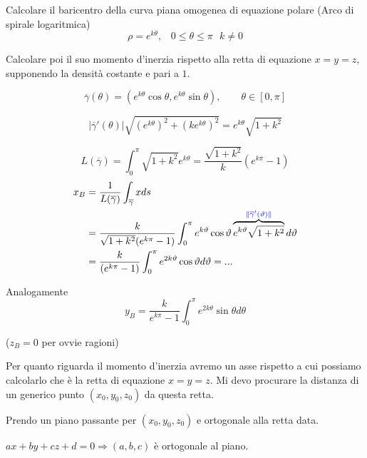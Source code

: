 \begin{exbar}
\begin{example}
	Calcolare il baricentro della curva piana omogenea di equazione polare {\color{blue}(Arco di spirale logaritmica)}
	\begin{equation*}
		\rho=e^{k\theta}, \,\,\,\, \, 0 \leq \theta \leq \pi\,\,\,\, k \neq 0
	\end{equation*}
	
	Calcolare poi il suo momento d'inerzia rispetto alla retta di equazione $x=y=z$, supponendo la densità costante e pari a $1$.
	
	\segnaposto %
	
	$$\overline{\gamma}(\theta)=(e^{k\theta}\cos \theta, e^{k\theta}\sin \theta), \qquad \theta \in [0,\pi]$$
	
	$$|\overline{\gamma}'(\theta)|\sqrt{(e^{k\theta})^2+(ke^{k\theta})^2}=e^{k\theta}\sqrt{1+k^2}$$
	
	$$L(\overline{\gamma})=\int_0^{\pi} \sqrt{1+k^2}e^{k\theta}=\frac{\sqrt{1+k^2}}{k}(e^{k\pi}-1)$$
	\begin{align*}
		x_B&=\frac{1}{L(\overline{\gamma})}\int_{\overline{\gamma}} x ds\\
		&= \frac{k}{\sqrt{1+k^2}(e^{k\pi}-1)}\int_0^\pi e^{k\theta} \cos \theta \overbrace{e^{k\theta}\sqrt{1+k^2}}^{{\color{blue} \|\overline{\gamma}'(\theta)\|}} d\theta\\
		&=\frac{k}{(e^{k\pi}-1)}\int_0^\pi e^{2k\theta} \cos \theta d \theta=...
	\end{align*}
	
	Analogamente
	\begin{equation*}
		y_B= \frac{k}{e^{k\pi}-1}\int_0^\pi e^{2k \theta} \sin \theta d \theta
	\end{equation*}
	
	{\color{blue}($z_B=0$ per ovvie ragioni)}
	
	Per quanto riguarda il momento d'inerzia avremo un asse rispetto a cui possiamo calcolarlo che è la retta di equazione $x=y=z$. Mi devo procurare la distanza di un generico punto $(x_0,y_0,z_0)$ da questa retta.

	\segnaposto %

	{\color{red}Prendo un piano passante per $(x_0,y_0,z_0)$ e ortogonale alla retta data.}
	
	{\color{teal}$ax+by+cz+d=0 \Rightarrow (a,b,c)$ è ortogonale al piano.}
	

\end{example}
\end{exbar}
